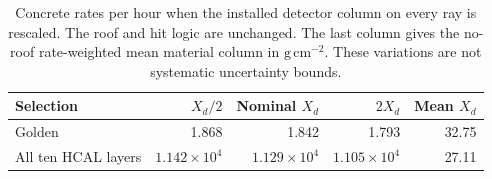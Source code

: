 \begin{table}[htbp]
\centering\small
\caption{Concrete rates per hour when the installed detector column on every ray is rescaled. The roof and hit logic are unchanged. The last column gives the no-roof rate-weighted mean material column in $\mathrm{g\,cm^{-2}}$. These variations are not systematic uncertainty bounds.}\label{tab:material}
\begin{tabular}{lrrrr}
\toprule
Selection & $X_d/2$ & Nominal $X_d$ & $2X_d$ & Mean $X_d$\\
\midrule
Golden & 1.868 & 1.842 & 1.793 & 32.75\\
All ten HCAL layers & $1.142\times10^{4}$ & $1.129\times10^{4}$ & $1.105\times10^{4}$ & 27.11\\
\bottomrule
\end{tabular}
\end{table}
